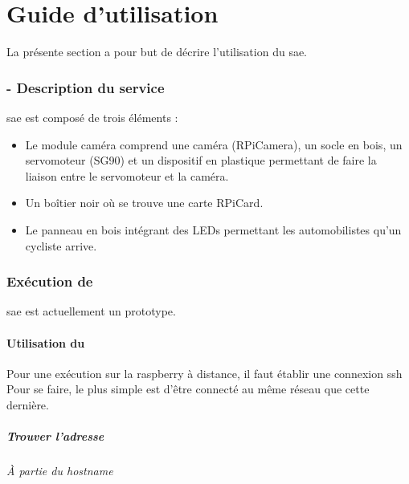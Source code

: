 \part{Guide d'utilisation}
La présente section a pour but de décrire l'utilisation du \gls{sae}.

\section{ - Description du service}
\label{sec:description_clearWay}

\gls{sae} est composé de trois éléments :
\begin{itemize}
    \item Le module caméra comprend une caméra (\gls{RPiCamera}), un socle en bois, un servomoteur (\gls{SG90})
          et un dispositif en plastique permettant de faire la liaison entre le servomoteur et la caméra.
    \item Un boîtier noir où se trouve une carte \gls{RPiCard}.
    \item Le panneau en bois intégrant des LEDs permettant les automobilistes qu'un cycliste arrive.
\end{itemize}

\section{Exécution de }
\label{sec:execution_clearWay}

\gls{sae} est actuellement un prototype.

\subsection{Utilisation du }
\label{sec:utilisationSSH}

Pour une exécution sur la \gls{raspberry} à distance, il faut établir une connexion \gls{ssh}
Pour se faire, le plus simple est d'être connecté au même réseau que cette dernière.

\subsubsection{Trouver l'adresse }
\label{sec:trouverIP}

\paragraph{À partie du \textit{hostname}}

